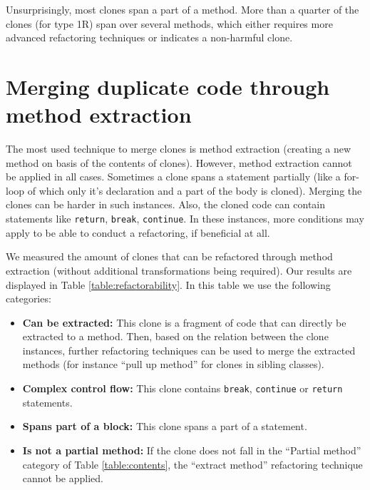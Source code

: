 \documentclass[a4paper]{article}
\begin{document}
Unsurprisingly, most clones span a part of a method. More than a quarter of the clones (for type 1R) span over several methods, which either requires more advanced refactoring techniques or indicates a non-harmful clone.

\section{Merging duplicate code through method extraction}\label{chap:mergingdups}
The most used technique to merge clones is method extraction (creating a new method on basis of the contents of clones). However, method extraction cannot be applied in all cases. Sometimes a clone spans a statement partially (like a for-loop of which only it's declaration and a part of the body is cloned). Merging the clones can be harder in such instances. Also, the cloned code can contain statements like \texttt{return}, \texttt{break}, \texttt{continue}. In these instances, more conditions may apply to be able to conduct a refactoring, if beneficial at all.

We measured the amount of clones that can be refactored through method extraction (without additional transformations being required). Our results are displayed in Table \ref{table:refactorability}. In this table we use the following categories:
\begin{itemize}
    \item \textbf{Can be extracted:} This clone is a fragment of code that can directly be extracted to a method. Then, based on the relation between the clone instances, further refactoring techniques can be used to merge the extracted methods (for instance ``pull up method'' for clones in sibling classes).
    \item \textbf{Complex control flow:} This clone contains \texttt{break}, \texttt{continue} or \texttt{return} statements.
    \item \textbf{Spans part of a block:} This clone spans a part of a statement.
    \item \textbf{Is not a partial method:} If the clone does not fall in the ``Partial method'' category of Table \ref{table:contents}, the ``extract method'' refactoring technique cannot be applied.
\end{itemize}
\end{document}
